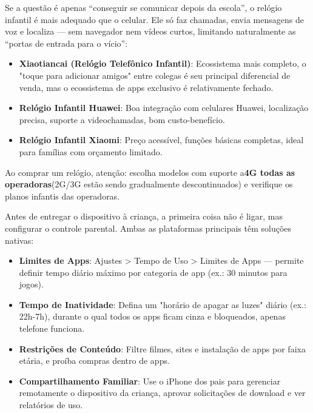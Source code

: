
Se a questão é apenas “conseguir se comunicar depois da escola”, o relógio infantil é mais adequado que o celular. Ele só faz chamadas, envia mensagens de voz e localiza — sem navegador nem vídeos curtos, limitando naturalmente as “portas de entrada para o vício”:

\begin{itemize}
  \item \textbf{Xiaotiancai (Relógio Telefônico Infantil)}: Ecossistema mais completo, o "toque para adicionar amigos" entre colegas é seu principal diferencial de venda, mas o ecossistema de apps exclusivo é relativamente fechado.
  \item \textbf{Relógio Infantil Huawei}: Boa integração com celulares Huawei, localização precisa, suporte a videochamadas, bom custo-benefício.
  \item \textbf{Relógio Infantil Xiaomi}: Preço acessível, funções básicas completas, ideal para famílias com orçamento limitado.
\end{itemize}

Ao comprar um relógio, atenção: escolha modelos com suporte a\textbf{4G todas as operadoras}(2G/3G estão sendo gradualmente descontinuados) e verifique os planos infantis das operadoras.


Antes de entregar o dispositivo à criança, a primeira coisa não é ligar, mas configurar o controle parental. Ambas as plataformas principais têm soluções nativas:


\begin{itemize}
  \item \textbf{Limites de Apps}: Ajustes > Tempo de Uso > Limites de Apps — permite definir tempo diário máximo por categoria de app (ex.: 30 minutos para jogos).
  \item \textbf{Tempo de Inatividade}: Defina um "horário de apagar as luzes" diário (ex.: 22h-7h), durante o qual todos os apps ficam cinza e bloqueados, apenas telefone funciona.
  \item \textbf{Restrições de Conteúdo}: Filtre filmes, sites e instalação de apps por faixa etária, e proíba compras dentro de apps.
  \item \textbf{Compartilhamento Familiar}: Use o iPhone dos pais para gerenciar remotamente o dispositivo da criança, aprovar solicitações de download e ver relatórios de uso.
\end{itemize}

